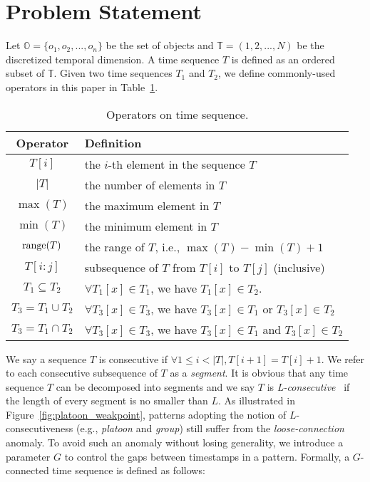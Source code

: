 \section{Problem Statement}
\label{sec:definition}
Let $\mathbb{O} = \{o_1 ,o_2,...,o_n\}$ be the set of objects and $\mathbb{T} =(1,2,...,N)$ be the discretized temporal dimension. A time sequence $T$ is defined as an ordered subset of $\mathbb{T}$. Given two time sequences $T_1$ and $T_2$, we define commonly-used operators in this paper in Table~\ref{tbl:operators}.

\begin{table}[h]
\centering
\begin{tabular}{|c|p{6.5cm}|}
\hline 
\textbf{Operator} & \textbf{Definition} \\ 
\hline
$T[i]$ & the $i$-th element in the sequence $T$ \\ 
\hline
$|T|$ & the number of elements in $T$\\
\hline
$\max(T)$ & the maximum element in $T$\\
\hline
$\min(T)$ & the minimum element in $T$\\
\hline
$\operatorname*{range}(T)$ & the range of $T$, i.e., $\max(T) - \min(T) +1$\\ 
\hline 
$T[i:j]$ & subsequence of $T$ from $T[i]$ to $T[j]$ (inclusive) \\ 
\hline
$T_1\subseteq T_2$ &  $\forall T_1[x]\in T_1$, we have $T_1[x]\in T_2$. \\\hline
$T_3=T_1\cup T_2$ & $\forall T_3[x]\in T_3$, we have $T_3[x]\in T_1$ or $T_3[x] \in T_2$\\ 
\hline
$T_3=T_1\cap T_2$ & $\forall T_3[x]\in T_3$, we have $T_3[x]\in T_1$ and $T_3[x] \in T_2$\\ 
\hline
\end{tabular}
\caption{Operators on time sequence.}
\label{tbl:operators}
\end{table} 

We say a sequence $T$ is consecutive 
if $\forall 1 \leq i < |T|, T[i+1] = T[i] + 1$.  We refer to each consecutive subsequence of $T$ as a \emph{segment}.
It is obvious that any time sequence $T$ can be decomposed into
segments and we say $T$ is \textit{L-consecutive}~\cite{li2015platoon} 
if the length of every segment is no smaller than $L$. As illustrated in Figure~\ref{fig:platoon_weakpoint}, patterns adopting the notion of $L$-consecutiveness (e.g., \emph{platoon} and \emph{group}) still suffer from the \emph{loose-connection} anomaly. 
To avoid such an anomaly without losing generality, we introduce a parameter $G$ to control the gaps between
timestamps in a pattern. Formally, a $G$-connected time sequence is defined as follows:


